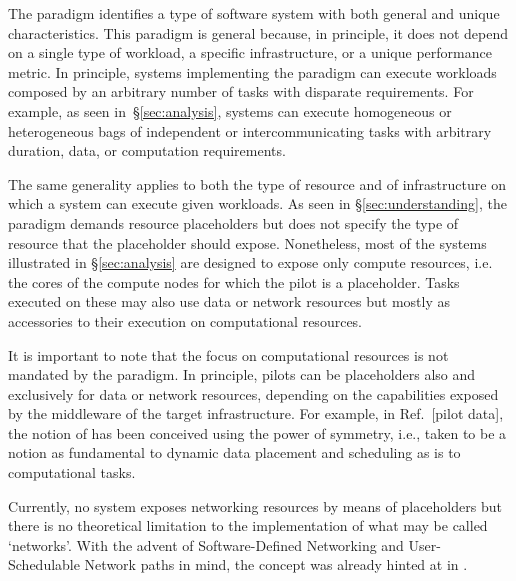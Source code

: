 \documentclass{sig-alternate}
\begin{document}

The \pilot paradigm identifies a type of software system with both general and
unique characteristics. This paradigm is general because, in principle, it does
not depend on a single type of workload, a specific infrastructure, or a unique
performance metric. In principle, systems implementing the \pilot paradigm can
execute workloads composed by an arbitrary number of tasks with disparate
requirements. For example, as seen in~\S\ref{sec:analysis}, \pilot systems can
execute homogeneous or heterogeneous bags of independent or intercommunicating
tasks with arbitrary duration, data, or computation requirements.

The same generality applies to both the type of resource and of infrastructure
on which a \pilot system can execute given workloads. As seen in
\S\ref{sec:understanding}, the \pilot paradigm demands resource placeholders
but does not specify the type of resource that the placeholder should expose.
Nonetheless, most of the \pilot systems illustrated in \S\ref{sec:analysis} are
designed to expose only compute resources, i.e. the cores of the compute nodes
for which the pilot is a placeholder. Tasks executed on these \pilots may also
use data or network resources but mostly as accessories to their execution on
computational resources.

It is important to note that the focus on computational resources is not
mandated by the \pilot paradigm. In principle, pilots can be placeholders also
and exclusively for data or network resources, depending on the capabilities
exposed by the middleware of the target infrastructure. For example, in
Ref.~[pilot data], the notion of \pilotdata has been conceived using the power
of symmetry, i.e., \pilotdata taken to be a notion as fundamental to dynamic
data placement and scheduling as \pilot is to computational tasks.

Currently, no \pilot system exposes networking resources by means of
placeholders but there is no theoretical limitation to the implementation of
what may be called `\pilot networks'. With the advent of Software-Defined
Networking and User-Schedulable Network paths in mind, the concept was already
hinted at in \cite{santcroos2012}.
\end{document}
